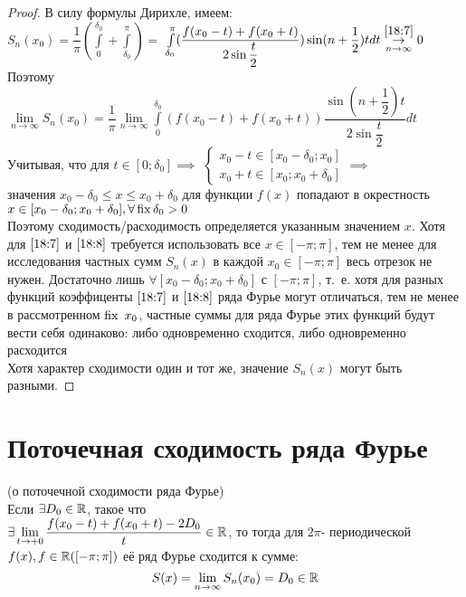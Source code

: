 \documentclass[../../main.tex]{subfiles}
\begin{document}
\begin{proof}
	В силу формулы Дирихле, имеем:\\
	$S_n(x_0) = \dfrac{1}{\pi}(\int\limits_{0}^{\delta_0} + 
	\int\limits_{\delta_0}^{\pi}) =$
	$\int\limits_{\delta_0}^{\pi}(\dfrac{f(x_0 - t) + f(x_0 + t)}
	{2\sin{\dfrac{t}{2}}})\sin(n+\dfrac{1}{2})tdt 
	 \overset{\eqref{18:7}}{\underset
		{n \rightarrow \infty}{\rightarrow}} 0$\\
	Поэтому \\
	$\lim\limits_{n \rightarrow \infty}{S_n(x_0)} = \dfrac{1}{\pi}
	\lim\limits_{n \rightarrow \infty}{\int\limits_{0}^{\delta_0}
	(f(x_0 - t) + f(x_0 + t)) \dfrac{\sin(n+\dfrac{1}{2})t}{
	2\sin\dfrac{t}{2}}}dt$\\
	Учитывая, что для $t \in [0; \delta_0 ] \implies$
	$\begin{cases}
		x_0 - t \in [x_0 - \delta_0; x_0] 
		\\
		x_0 + t \in [x_0; x_0 + \delta_0] 
	\end{cases}\implies$ \\
	значения $x_0 - \delta_0 \leq x \leq x_0 + \delta_0$ для функции $f(x)$
	попадают в окрестность\\
	 $x \in [x_0 - \delta_0; x_0 + \delta_0], \forall \operatorname{fix}
	  \delta_0 > 0$\\
	 Поэтому сходимость/расходимость определяется указанным значением $x$.
	 Хотя для $\eqref{18:7}$ и $\eqref{18:8}$ требуется использовать все
	 $x \in [-\pi; \pi]$, тем не менее для исследования частных сумм 
	 $S_n(x)$ в каждой $x_0 \in [-\pi; \pi]$ весь отрезок не нужен.
	 Достаточно лишь $\forall [x_0 - \delta_0; x_0 + \delta_0]$ с
	 $[-\pi; \pi]$, т.~е. хотя для разных функций коэффиценты 
	 $\eqref{18:7}$ и $\eqref{18:8}$ ряда Фурье могут отличаться, 
	 тем не менее в рассмотренном $\fix\ x_0$, частные суммы для
	 ряда Фурье
	 этих функций будут вести себя одинаково: либо одновременно сходится, 
	 либо одновременно расходится\\
	 Хотя характер сходимости один и тот же, значение $S_n(x)$ могут быть
	 разными.
\end{proof}

\section{Поточечная сходимость ряда Фурье}
\begin{thm}(о поточечной сходимости ряда Фурье)\\
	Если $\exists D_0 \in \mathbb{R}$, такое что
	\\$\exists \lim\limits_{t \rightarrow +0}{\dfrac
		{f(x_0 - t) + f(x_0 + t) - 2D_0}{t}} \in \mathbb{R}$, то тогда для
	$2\pi$- периодической $f(x), f \in \mathbb{R}([-\pi; \pi])$ её ряд Фурье
	сходится к сумме:
	\begin{equation}
		\label{18:11}
		S(x) = \lim\limits_{n \rightarrow \infty}S_n(x_0) = D_0 \in \mathbb{R}
	\end{equation}
\end{thm}
\end{document}
